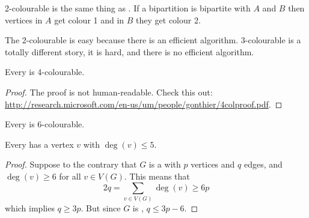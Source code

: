 \documentclass[english, 11pt]{article}
\begin{document}
\begin{note}
  2-colourable is the same thing as . If a bipartition is bipartite with $A$ and $B$ then vertices in $A$ get colour 1 and in $B$ they get colour 2.
\end{note}

The 2-colourable is easy because there is an efficient algorithm. 3-colourable is a totally different story, it is hard, and there is no efficient algorithm.

\begin{thrm}\label{4color}
  Every   is 4-colourable.
\end{thrm}

\begin{proof}
  The proof is not human-readable. Check this out: \url{http://research.microsoft.com/en-us/um/people/gonthier/4colproof.pdf}.
\end{proof}

\begin{thrm}\label{6color}
  Every   is 6-colourable.
\end{thrm}

\begin{lem}
  Every   has a vertex $v$ with $\deg(v) \leq 5$.
\end{lem}

\begin{proof}
  Suppose to the contrary that $G$ is a   with $p$ vertices and $q$ edges, and $\deg(v) \geq 6$ for all $v \in V(G)$. This means that
 \[ 2q = \sum_{v \in V(G)} \deg(v) \geq 6p \]
 which implies $q \geq 3p$. But since $G$ is , $q \leq 3p - 6$.
\end{proof}
\end{document}
